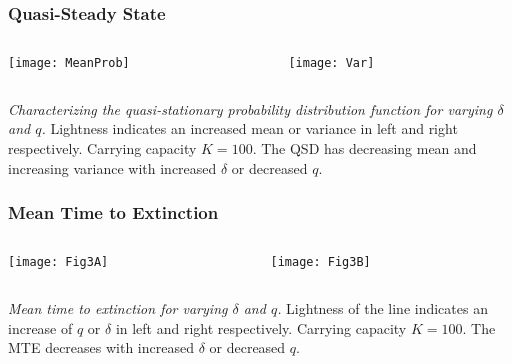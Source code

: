 \documentclass{beamer}
\begin{document}
\begin{frame}
\frametitle{Quasi-Steady State}
\begin{columns}
\begin{column}{5.5cm}
\begin{center}
\texttt{[image: MeanProb]}
\end{center}
\end{column}
\begin{column}{5.5cm}
\begin{center}
\texttt{[image: Var]}
\end{center}
\end{column}
\end{columns}
\justifying
\emph{Characterizing the quasi-stationary probability distribution function for varying $\delta$ and $q$.} 
Lightness indicates an increased mean or variance in left and right respectively. Carrying capacity $K=100$. 
The QSD has decreasing mean and increasing variance with increased $\delta$ or decreased $q$. 
\end{frame}


\begin{frame}
\frametitle{Mean Time to Extinction}
\begin{columns}
	\begin{column}{5.5cm}
		\begin{center}
			\texttt{[image: Fig3A]}
		\end{center}
	\end{column}
	\begin{column}{5.5cm}
		\begin{center}
			\texttt{[image: Fig3B]}
		\end{center}
	\end{column}
\end{columns}
\justifying
\emph{Mean time to extinction for varying $\delta$ and $q$.} 
Lightness of the line indicates an increase of $q$ or $\delta$ in left and right respectively. 
Carrying capacity $K=100$. 
The MTE decreases with increased $\delta$ or decreased $q$. 
\end{frame}
\end{document}
